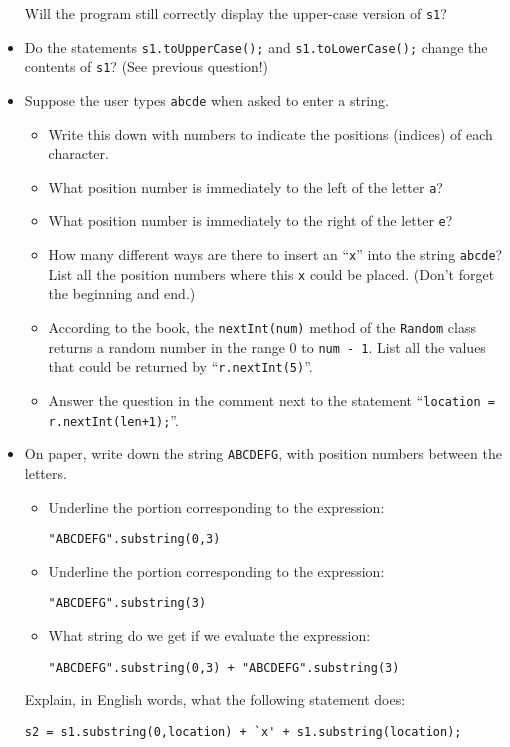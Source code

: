 \begin{itemize}
Will the program still correctly display the upper-case version of {\tt s1}?
\item
Do the statements {\tt s1.toUpperCase();} and {\tt s1.toLowerCase();}
change the contents of {\tt s1}? (See previous question!)
\item
Suppose the user types {\tt abcde} when asked to enter a string.
\begin{itemize}
\item Write this down with numbers to indicate the positions (indices) of each character.
\item
What position number is immediately to the left of the letter {\tt a}?
\item
What position number is immediately to the right of the letter {\tt e}?
\item
How many different ways are there to insert an ``{\tt x}'' into the string
{\tt abcde}? List all the position numbers where this {\tt x} could be placed.
(Don't forget the beginning and end.)
\item
According to the book, the {\tt nextInt(num)} method of the {\tt Random}
class returns a random number in the range 0 to {\tt num - 1}.
List all the values that could be returned by ``{\tt r.nextInt(5)}''.
\item
Answer the question in the comment next to the statement ``\verb$location = r.nextInt(len+1);$''.
\end{itemize}
\item
On paper, write down the string {\tt ABCDEFG}, with position numbers
between the letters.
\begin{itemize}
\item
Underline the portion corresponding to the
expression:
\begin{center}
\verb$"ABCDEFG".substring(0,3)$
\end{center}
\item
Underline the portion corresponding to the
expression:
\begin{center}
\verb$"ABCDEFG".substring(3)$
\end{center}
\item
What string do we get if we evaluate the expression:
\begin{center}
\verb$"ABCDEFG".substring(0,3) + "ABCDEFG".substring(3)$
\end{center}
\end{itemize}
Explain, in English words, what the following statement does:
\begin{center}
\verb$s2 = s1.substring(0,location) + `x' + s1.substring(location);$

\end{center}
\end{itemize}
